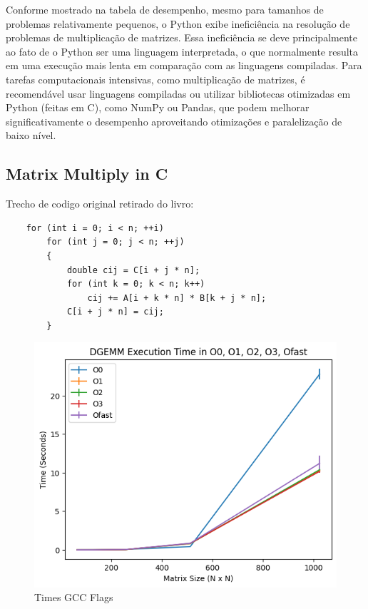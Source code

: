 \documentclass[12pt]{article}
\begin{document}
Conforme mostrado na tabela de desempenho, mesmo para tamanhos de problemas relativamente pequenos, o Python exibe ineficiência na resolução de problemas de multiplicação de matrizes. Essa ineficiência se deve principalmente ao fato de o Python ser uma linguagem interpretada, o que normalmente resulta em uma execução mais lenta em comparação com as linguagens compiladas. Para tarefas computacionais intensivas, como multiplicação de matrizes, é recomendável usar linguagens compiladas ou utilizar bibliotecas otimizadas em Python (feitas em C), como NumPy ou Pandas, que podem melhorar significativamente o desempenho aproveitando otimizações e paralelização de baixo nível.

\subsection{Matrix Multiply in C}

Trecho de codigo original retirado do livro:


\begin{lstlisting}
    for (int i = 0; i < n; ++i)
        for (int j = 0; j < n; ++j)
        {
            double cij = C[i + j * n];
            for (int k = 0; k < n; k++)
                cij += A[i + k * n] * B[k + j * n];
            C[i + j * n] = cij;
        }
\end{lstlisting}

\begin{figure}[h]
    \centering
    \includegraphics[scale=0.75]{figures/times_gcc.png}
    \caption{Times GCC Flags}
    \label{fig:times-gcc-flagsl}
\end{figure}
\end{document}
